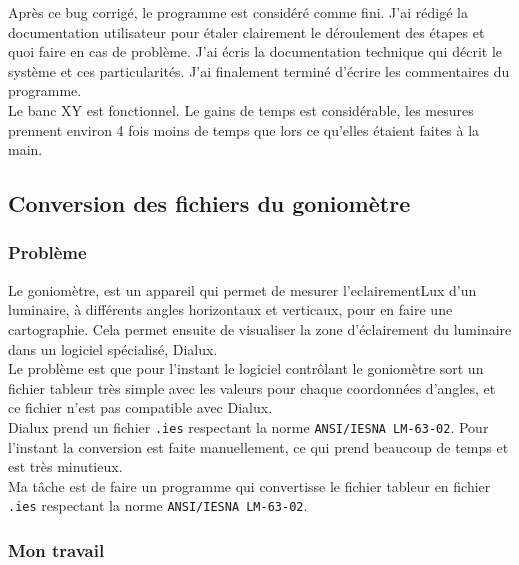 \documentclass[12pt]{article}
\begin{document}
Après ce bug corrigé, le programme est considéré comme fini.
J'ai rédigé la documentation utilisateur pour étaler clairement le déroulement des étapes et quoi faire en cas de problème.
J'ai écris la documentation technique qui décrit le système et ces particularités.
J'ai finalement terminé d'écrire les commentaires du programme.\\
Le banc XY est fonctionnel.
Le gains de temps est considérable, les mesures prennent environ 4 fois moins de temps que lors ce qu'elles étaient faites à la main.

\newpage
\subsection{Conversion des fichiers du goniomètre }

\subsubsection{Problème}

Le goniomètre, est un appareil qui permet de mesurer l'\gls{eclairementLux} d'un luminaire, à différents angles horizontaux et verticaux, pour en faire une cartographie.
Cela permet ensuite de visualiser la zone d'éclairement du luminaire dans un logiciel spécialisé, Dialux.\\
Le problème est que pour l'instant le logiciel contrôlant le goniomètre sort un fichier tableur très simple avec les valeurs pour chaque coordonnées d'angles, et ce fichier n'est pas compatible avec Dialux.\\
Dialux prend un fichier \verb|.ies| respectant la norme \verb|ANSI/IESNA LM-63-02|.
Pour l'instant la conversion est faite manuellement, ce qui prend beaucoup de temps et est très minutieux.\\
Ma tâche est de faire un programme qui convertisse le fichier tableur en fichier \verb|.ies| respectant la norme \verb|ANSI/IESNA LM-63-02|.


\subsubsection{Mon travail}
\end{document}
